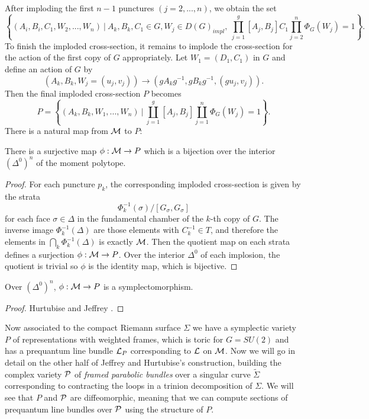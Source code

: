 	After imploding the first $n-1$ punctures $(j=2,...,n)$, we obtain the set
	\begin{equation}
		\left\{
		(A_i,B_i,C_1,W_2,...,W_n)~|~ A_k,B_k,C_1 \in G, W_j \in D(G)_{impl},~ \prod_{j=1}^{g}[A_j,B_j]C_1\prod_{j=2}^{n} \Phi_G(W_j) = 1 
		\right\}.
	\end{equation}
	To finish the imploded cross-section, it remains to implode the cross-section for the action of the first copy of $G$ appropriately. Let $W_1 = (D_1,C_1)$ in $G$ and define an action of $G$ by
	\begin{equation}
		(A_k,B_k,W_j=(u_j,v_j)) \to (gA_kg^{-1}, gB_kg^{-1}, (gu_j,v_j)).
	\end{equation}
	Then the final imploded cross-section $P$ becomes \cite{hurtubise_representations_2000}
	\begin{equation}
		\label{e:P-def}
		P = \left\{(A_k,B_k,W_1,...,W_n)~|~ \coprod_{j=1}^g[A_j,B_j]\coprod_{j=1}^n \Phi_G(W_j)=1\right\}.
	\end{equation}
	There is a natural map from $\mathcal{M}$ to $P$:
	\begin{lemma}
		There is a surjective map $\phi:\mathcal{M}\to P$ which is a bijection over the interior $(\Delta^0)^n$ of the moment polytope. 
	\end{lemma}
	\begin{proof}
		For each puncture $p_k$, the corresponding imploded cross-section is given by the strata
		\begin{equation}
			\Phi_k^{-1}(\sigma)/[G_\sigma, G_\sigma]
		\end{equation}
		for each face $\sigma \in \Delta$ in the fundamental chamber of the $k$-th copy of $G$. The inverse image $\Phi_k^{-1}(\Delta)$ are those elements with $C_k^{-1} \in T$, and therefore the elements in $\bigcap_k \Phi_k^{-1} (\Delta)$ is exactly $\mathcal{M}$. Then the quotient map on each strata defines a surjection $\phi:\mathcal{M}\to P$. Over the interior $\Delta^0$ of each implosion, the quotient is trivial so $\phi$ is the identity map, which is bijective. 
	\end{proof}
	\begin{theorem}
		Over $(\Delta^0)^n$, $\phi:\mathcal{M} \to P$ is a symplectomorphism.
	\end{theorem}
	\begin{proof}
		Hurtubise and Jeffrey \cite[Proposition 2.37]{hurtubise_representations_2000}.
	\end{proof}
	

	\pagebreak
	Now associated to the compact Riemann surface $\Sigma$ we have a symplectic variety $P$ of representations with weighted frames, which is toric for $G=SU(2)$ and has a prequantum line bundle $\mathcal{L}_P$ corresponding to $\mathcal{L}$ on $\mathcal{M}$. Now we will go in detail on the other half of Jeffrey and Hurtubise's construction, building the complex variety $\mathcal{P}$ of \emph{framed parabolic bundles} over a singular curve $\tilde{\Sigma}$ corresponding to contracting the loops in a trinion decomposition of $\Sigma$. We will see that $P$ and $\mathcal{P}$ are diffeomorphic, meaning that we can compute sections of prequantum line bundles over $\mathcal{P}$ using the structure of $P$.
	
